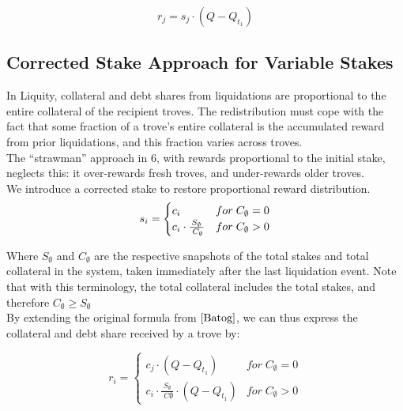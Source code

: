 \documentclass[reqno]{article}
\begin{document}
\begin{equation} 
    r_j = s_j \cdot (Q - Q_{t_1})
\end{equation}

\bigskip

\subsection{Corrected Stake Approach for Variable Stakes}
In Liquity, collateral and debt shares from liquidations are proportional to the entire collateral of the recipient troves. The redistribution must cope with the fact that some fraction of a trove's entire collateral is the accumulated reward from prior liquidations, and this fraction varies across troves. \\

The “strawman” approach in 6, with rewards proportional to the initial stake, neglects this: it over-rewards fresh troves, and under-rewards older troves. \\

We introduce a corrected stake to restore proportional reward distribution. \\

\begin{equation} \label{eq:2}
    s_i=
        \begin{cases} 
            c_i & for \;C_\emptyset = 0\\
            \mathlarger{c_i} \cdot \frac{S_\emptyset} {\;C_\emptyset} & for \;C_\emptyset>0
        \end{cases}
\end{equation}

\bigskip
Where $S_\emptyset$ and $C_\emptyset$ are the respective snapshots of the total stakes and total collateral in the system, taken immediately after the last liquidation event. Note that with this terminology, the total collateral includes the total stakes, and therefore $C_\emptyset \ge S_\emptyset$
\\

By extending the original formula from $\cite{Batog}$, we can thus express the collateral and debt share received by a trove by:

\begin{equation}
    r_i=
        \begin{cases} 
            c_j \cdot (Q - Q_{t_1}) & for \;C_\emptyset = 0\\
            c_i \cdot \frac{S_\emptyset} {\;C\emptyset} \cdot (Q - Q_{t_1}) & for \;C_\emptyset>0
        \end{cases}
\end{equation}
\end{document}

